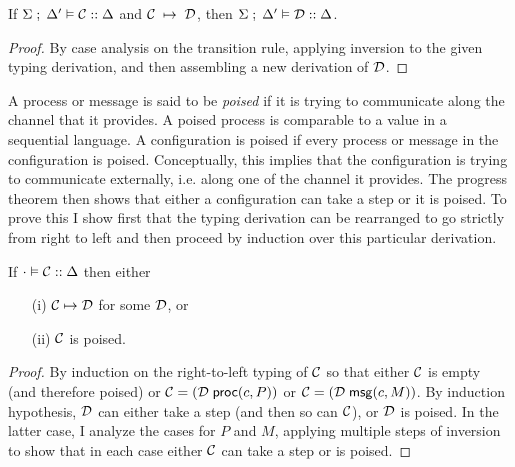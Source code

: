 \begin{theorem}
\label{thm:preservation}
If $\Sigma \; ; \; \Delta' \vDash \mathcal{C} :: \Delta$ and $\mathcal{C} \; \mapsto \; \mathcal{D}$,
then $\Sigma \; ; \; \Delta' \vDash \mathcal{D} :: \Delta$.
\end{theorem}
\begin{proof}
  By case analysis on the transition rule, applying inversion to the
  given typing derivation, and then assembling a new derivation of
  $\mathcal{D}$.
\end{proof}

A process or message is said to be \emph{poised} if it is trying to
communicate along the channel that it provides.  A poised process is
comparable to a value in a sequential language. A configuration is
poised if every process or message in the configuration is poised.
Conceptually, this implies that the configuration is trying to communicate
externally, i.e. along one of the channel it provides.
The progress theorem then shows that either a configuration can take a
step or it is poised.  To prove this I show first that the typing
derivation can be rearranged to go strictly from right to left and
then proceed by induction over this particular derivation.

\begin{theorem}
\label{thm:progress}
\mbox{}
If $\cdot \vDash \mathcal{C} :: \Delta$ then either
\begin{enumerate}
\item[(i)] $\mathcal{C} \mapsto \mathcal{D}$ for some $\mathcal{D}$, or
\item[(ii)] $\mathcal{C}$ is poised.
\end{enumerate}
\end{theorem}
\begin{proof}
By induction on the right-to-left typing of $\mathcal{C}$ so that either
$\mathcal{C}$ is empty (and therefore poised) or
$\mathcal{C} = (\mathcal{D}\; \mathsf{proc}(c, P))$ or
$\mathcal{C} = (\mathcal{D}\; \mathsf{msg}(c, M))$. By induction hypothesis, $\mathcal{D}$ can
either take a step (and then so can $\mathcal{C}$), or $\mathcal{D}$ is poised.  In
the latter case, I
analyze the cases for $P$ and $M$, applying multiple steps of
inversion to show that in each
case either $\mathcal{C}$ can take a step or is poised.
\end{proof}


